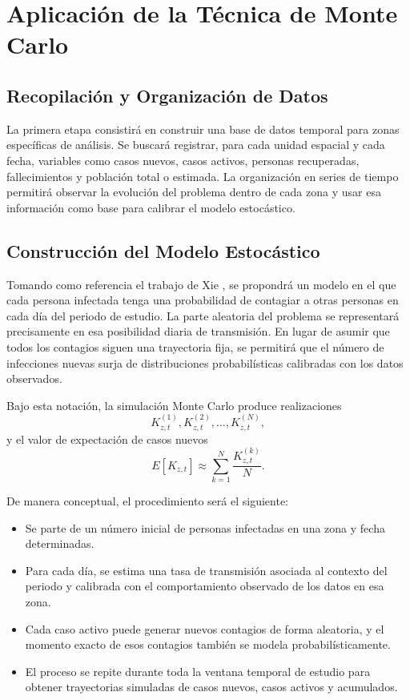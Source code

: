 \documentclass[12pt]{article}
\begin{document}
\newpage

\section{Aplicación de la Técnica de Monte Carlo}

\subsection{Recopilación y Organización de Datos}

La primera etapa consistirá en construir una base de datos temporal para zonas
específicas de análisis. Se buscará registrar, para cada unidad espacial y cada
fecha, variables como casos nuevos, casos activos, personas recuperadas,
fallecimientos y población total o estimada. La organización en series de
tiempo permitirá observar la evolución del problema dentro de cada zona y usar
esa información como base para calibrar el modelo estocástico.

\subsection{Construcción del Modelo Estocástico}

Tomando como referencia el trabajo de Xie \cite{Xie2020}, se propondrá un
modelo en el que cada persona infectada tenga una probabilidad de contagiar a
otras personas en cada día del periodo de estudio. La parte aleatoria del
problema se representará precisamente en esa posibilidad diaria de transmisión.
En lugar de asumir que todos los contagios siguen una trayectoria fija, se
permitirá que el número de infecciones nuevas surja de distribuciones
probabilísticas calibradas con los datos observados.

Bajo esta notación, la simulación Monte Carlo produce realizaciones
\[
  K_{z,t}^{(1)}, K_{z,t}^{(2)}, \dots, K_{z,t}^{(N)},
\]
y el valor de expectación de casos nuevos
\[
  E[K_{z,t}] \approx
  \sum_{k=1}^{N} \frac{K_{z,t}^{(k)}}{N}.
\]

De manera conceptual, el procedimiento será el siguiente:

\begin{itemize}
  \item Se parte de un número inicial de personas infectadas en una zona y
        fecha determinadas.
  \item Para cada día, se estima una tasa de transmisión asociada al contexto
        del periodo y calibrada con el comportamiento observado de los datos en
        esa zona.
  \item Cada caso activo puede generar nuevos contagios de forma aleatoria, y
        el momento exacto de esos contagios también se modela
        probabilísticamente.
  \item El proceso se repite durante toda la ventana temporal de estudio para
        obtener trayectorias simuladas de casos nuevos, casos activos y
        acumulados.
\end{itemize}
\end{document}
